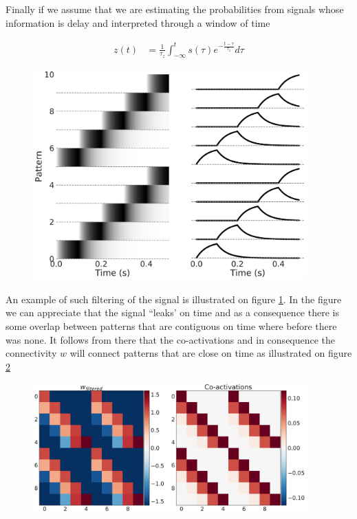 \documentclass[10pt,a4paper]{article}
\begin{document}
Finally if we assume that we are estimating the probabilities from signals whose information is delay and interpreted through a window of time 

\begin{align}
z(t) &= \frac{1}{\tau_z } \int_{-\infty}^{t} s(\tau) e^{-\frac{t - \tau}{\tau_z}} d\tau \label{eq:flitering} 
\end{align}


\begin{figure}[H]
    \centering
  \includegraphics[width=10.5cm]{off_line_rule_illustration_filter.pdf} %
	\label{fig:off_line_rule_filter}
\end{figure}

An example of such filtering of the signal is illustrated on figure \ref{fig:off_line_rule_filter}. In the figure we can appreciate that the signal ``leaks' on time and as a consequence there is some overlap between patterns that are contiguous on time where before there was none. It follows from there that the co-activations and in consequence the connectivity $w$ will connect patterns that are close on time as illustrated on figure \ref{fig:off_line_rule_filters_weights}


\begin{figure}[H]
    \centering
    \includegraphics[width=10.5cm]{off_line_rule_illustration_weight_filtered.pdf}
	\label{fig:off_line_rule_filters_weights}
\end{figure}
\end{document}
